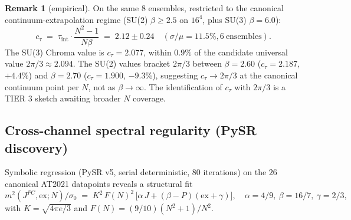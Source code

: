 \documentclass[11pt,a4paper,reqno]{amsart}
\theoremstyle{definition}
\newtheorem{remark}[theorem]{Remark}
\begin{document}
\begin{remark}[empirical]
On the same 8 ensembles, restricted to the canonical continuum-extrapolation regime
(SU(2) $\beta\geq 2.5$ on $16^4$, plus SU(3) $\beta{=}6.0$):
\[
  c_\tau \;=\; \tau_{\mathrm{int}}\cdot\frac{N^2-1}{N\beta} \;=\; 2.12\pm 0.24\quad
  (\sigma/\mu = 11.5\%, 6\ \text{ensembles}).
\]
The SU(3) Chroma value is $c_\tau{=}2.077$, within $0.9\%$ of the candidate
universal value $2\pi/3 \approx 2.094$. The SU(2) values bracket $2\pi/3$
between $\beta{=}2.60$ ($c_\tau{=}2.187$, $+4.4\%$) and $\beta{=}2.70$ ($c_\tau{=}1.900$,
$-9.3\%$), suggesting $c_\tau\to 2\pi/3$ at the canonical continuum point per $N$, not as
$\beta\to\infty$. The identification of $c_\tau$ with $2\pi/3$ is a TIER 3 sketch awaiting
broader $N$ coverage.
\end{remark}

\subsection{Cross-channel spectral regularity (PySR discovery)}
\label{sec:spin-tower}

Symbolic regression (PySR v5, serial deterministic, $80$ iterations) on the
$26$ canonical AT2021 datapoints reveals a structural fit
\begin{equation}
  m^2(J^{PC},\mathrm{ex};N)/\sigma_0 \;=\; K^2\,F(N)^2\,
  \bigl[\alpha\,J + (\beta - P)(\mathrm{ex}+\gamma)\bigr],
  \quad
  \alpha=4/9,\ \beta=16/7,\ \gamma=2/3,
\end{equation}
with $K=\sqrt{4\pi e/3}$ and $F(N)=(9/10)(N^2+1)/N^2$.
\end{document}
